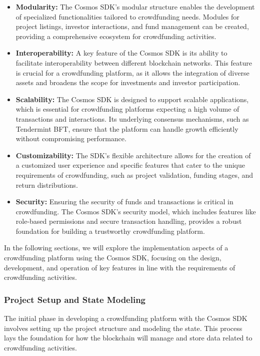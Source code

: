 \begin{itemize}
    \item \textbf{Modularity:} The Cosmos SDK's modular structure enables the development of specialized functionalities tailored to crowdfunding needs. Modules for project listings, investor interactions, and fund management can be created, providing a comprehensive ecosystem for crowdfunding activities.
    \item \textbf{Interoperability:} A key feature of the Cosmos SDK is its ability to facilitate interoperability between different blockchain networks. This feature is crucial for a crowdfunding platform, as it allows the integration of diverse assets and broadens the scope for investments and investor participation.
    \item \textbf{Scalability:} The Cosmos SDK is designed to support scalable applications, which is essential for crowdfunding platforms expecting a high volume of transactions and interactions. Its underlying consensus mechanisms, such as Tendermint BFT, ensure that the platform can handle growth efficiently without compromising performance.
    \item \textbf{Customizability:} The SDK's flexible architecture allows for the creation of a customized user experience and specific features that cater to the unique requirements of crowdfunding, such as project validation, funding stages, and return distributions.
    \item \textbf{Security:} Ensuring the security of funds and transactions is critical in crowdfunding. The Cosmos SDK's security model, which includes features like role-based permissions and secure transaction handling, provides a robust foundation for building a trustworthy crowdfunding platform.
\end{itemize}

In the following sections, we will explore the implementation aspects of a crowdfunding platform using the Cosmos SDK, focusing on the design, development, and operation of key features in line with the requirements of crowdfunding activities.

\subsubsection{Project Setup and State Modeling}

The initial phase in developing a crowdfunding platform with the Cosmos SDK involves setting up the project structure and modeling the state. This process lays the foundation for how the blockchain will manage and store data related to crowdfunding activities.

